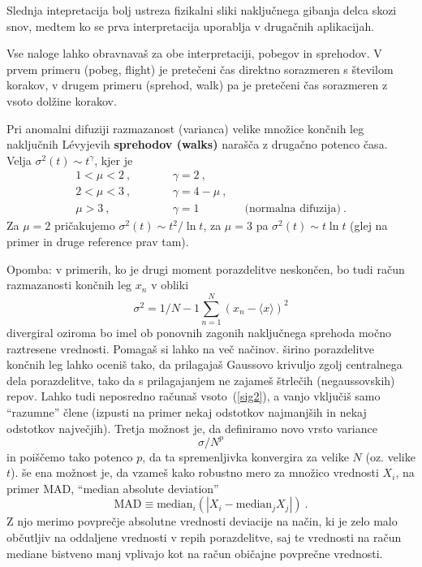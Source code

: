 \documentclass{article}
\begin{document}
Slednja intepretacija bolj ustreza fizikalni sliki naključnega gibanja delca skozi snov, medtem ko
se prva interpretacija uporablja v druga\v cnih aplikacijah.

Vse naloge lahko obravnavaš za obe interpretaciji, pobegov in sprehodov. V prvem primeru (pobeg, flight) je
prete\v ceni \v cas direktno sorazmeren s \v stevilom korakov, v drugem primeru (sprehod, walk) pa je
prete\v ceni \v cas  sorazmeren z vsoto dol\v zine korakov.


Pri anomalni difuziji razmazanost (varianca) velike množice
končnih leg naključnih L\'evyjevih \textbf{sprehodov (walks)} narašča z drugačno potenco časa.
Velja $\sigma^2(t) \sim t^\gamma$, kjer je
\begin{eqnarray*}
1 < \mu < 2 \>, &\qquad& \gamma = 2 \>, \\
2 < \mu < 3 \>, &\qquad& \gamma = 4 - \mu \>, \\
    \mu > 3 \>, &\qquad& \gamma = 1 \qquad\qquad
                                    \text{(normalna difuzija)} \>.
\end{eqnarray*}
Za $\mu=2$ pričakujemo $\sigma^2(t) \sim t^2 / \ln t$,
za $\mu=3$ pa $\sigma^2(t) \sim t \ln t$ (glej na primer
in druge reference prav tam).


Opomba: v primerih, ko je drugi
moment porazdelitve neskončen, bo tudi račun razmazanosti
končnih leg $x_n$ v obliki
\begin{equation}
\sigma^2 = {1 / N-1} \sum_{n=1}^N \left( x_n - \langle x \rangle \right)^2
\label{sig2}
\end{equation}
divergiral oziroma bo imel ob ponovnih zagonih naključnega sprehoda
močno raztresene vrednosti.  Pomagaš si lahko na več načinov.
širino porazdelitve končnih leg lahko oceniš tako, da prilagajaš
Gaussovo krivuljo zgolj centralnega dela porazdelitve, tako da
s prilagajanjem ne zajameš štrlečih (negaussovskih) repov.
Lahko tudi neposredno računaš vsoto~(\ref{sig2}), a vanjo
vključiš samo ``razumne'' člene (izpusti na primer nekaj
odstotkov najmanjših in nekaj odstotkov največjih).
Tretja možnost je, da definiramo novo vrsto variance
\begin{equation*}
  \sigma / N^p
\end{equation*}
in poiščemo tako potenco $p$, da ta spremenljivka konvergira
za velike $N$ (oz. velike $t$).  še ena možnost je, da vzameš
kako robustno mero za množico vrednosti $X_i$, na primer MAD,
``median absolute deviation''
\begin{equation*}
  \mathrm{MAD} \equiv \mathrm{median}_i\left( | X_i - \mathrm{median}_j X_j | \right) \>.
\end{equation*}
Z njo merimo povprečje absolutne vrednosti deviacije na način,
ki je zelo malo občutljiv na oddaljene vrednosti v repih porazdelitve,
saj te vrednosti na račun mediane bistveno manj vplivajo kot na
račun običajne povprečne vrednosti.
\end{document}
